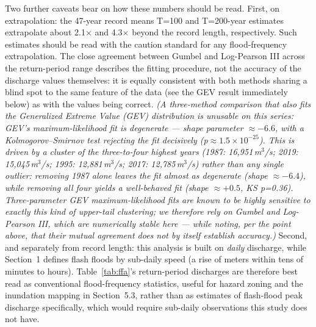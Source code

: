 \documentclass[11pt]{article}
\begin{document}
Two further caveats bear on how these numbers should be read. First, on extrapolation: the 47-year record means T=100 and T=200-year estimates extrapolate about 2.1$\times$ and 4.3$\times$ beyond the record length, respectively. Such estimates should be read with the caution standard for any flood-frequency extrapolation. The close agreement between Gumbel and Log-Pearson III across the return-period range describes the fitting procedure, not the accuracy of the discharge values themselves: it is equally consistent with both methods sharing a blind spot to the same feature of the data (see the GEV result immediately below) as with the values being correct. \emph{(A three-method comparison that also fits the Generalized Extreme Value (GEV) distribution is unusable on this series: GEV's maximum-likelihood fit is degenerate --- shape parameter ${\approx}-6.6$, with a Kolmogorov--Smirnov test rejecting the fit decisively (p${\approx}1.5\times10^{-25}$). This is driven by a cluster of the three-to-four highest years (1987: 16,951\,m$^3$/s; 2019: 15,045\,m$^3$/s; 1995: 12,881\,m$^3$/s; 2017: 12,785\,m$^3$/s) rather than any single outlier: removing 1987 alone leaves the fit almost as degenerate (shape ${\approx}-6.4$), while removing all four yields a well-behaved fit (shape ${\approx}+0.5$, KS p=0.36). Three-parameter GEV maximum-likelihood fits are known to be highly sensitive to exactly this kind of upper-tail clustering; we therefore rely on Gumbel and Log-Pearson III, which are numerically stable here --- while noting, per the point above, that their mutual agreement does not by itself establish accuracy.)} Second, and separately from record length: this analysis is built on \emph{daily} discharge, while Section~1 defines flash floods by sub-daily speed (a rise of meters within tens of minutes to hours). Table~\ref{tab:ffa}'s return-period discharges are therefore best read as conventional flood-frequency statistics, useful for hazard zoning and the inundation mapping in Section~5.3, rather than as estimates of flash-flood peak discharge specifically, which would require sub-daily observations this study does not have.
\end{document}
